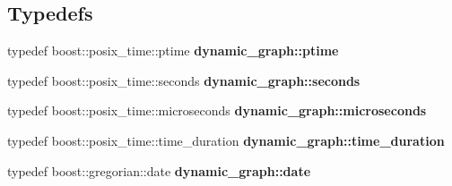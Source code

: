 \subsection*{Typedefs}
\begin{DoxyCompactItemize}
\item 
typedef boost\+::posix\+\_\+time\+::ptime {\bfseries dynamic\+\_\+graph\+::ptime}\hypertarget{namespacedynamic__graph_a51b66113dc1d4eee03abd7779479cc69}{}\label{namespacedynamic__graph_a51b66113dc1d4eee03abd7779479cc69}

\item 
typedef boost\+::posix\+\_\+time\+::seconds {\bfseries dynamic\+\_\+graph\+::seconds}\hypertarget{namespacedynamic__graph_a6b06a10863ed1b2411191a895621dbb0}{}\label{namespacedynamic__graph_a6b06a10863ed1b2411191a895621dbb0}

\item 
typedef boost\+::posix\+\_\+time\+::microseconds {\bfseries dynamic\+\_\+graph\+::microseconds}\hypertarget{namespacedynamic__graph_a4244ef24ba8efe2112a5535fd562e8b4}{}\label{namespacedynamic__graph_a4244ef24ba8efe2112a5535fd562e8b4}

\item 
typedef boost\+::posix\+\_\+time\+::time\+\_\+duration {\bfseries dynamic\+\_\+graph\+::time\+\_\+duration}\hypertarget{namespacedynamic__graph_a4be0df79b9608a71968778c85d4a5f25}{}\label{namespacedynamic__graph_a4be0df79b9608a71968778c85d4a5f25}

\item 
typedef boost\+::gregorian\+::date {\bfseries dynamic\+\_\+graph\+::date}\hypertarget{namespacedynamic__graph_a1a7a95fd96c4e7f1b829260880f14d91}{}\label{namespacedynamic__graph_a1a7a95fd96c4e7f1b829260880f14d91}

\end{DoxyCompactItemize}
